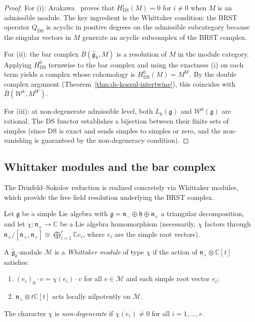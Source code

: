 \begin{proof}
For (i): Arakawa~\cite{Arakawa17} proves that $H^i_{\mathrm{DS}}(M) = 0$
for $i \neq 0$ when $M$ is an admissible module. The key
ingredient is the Whittaker condition: the BRST operator
$Q_{\mathrm{DS}}$ is acyclic in positive degrees on the
admissible subcategory because the singular vectors in
$M$ generate an acyclic subcomplex of the BRST complex.

For (ii): the bar complex $\bar{B}(\widehat{\mathfrak{g}}_k, M)$
is a resolution of $M$ in the module category. Applying
$H^0_{\mathrm{DS}}$ termwise to the bar complex and using the
exactness (i) on each term yields a complex whose cohomology
is $H^0_{\mathrm{DS}}(M) = M^W$. By the double complex
argument (Theorem~\ref{thm:ds-koszul-intertwine}), this
coincides with $\bar{B}(\mathcal{W}^k, M^W)$.

For (iii): at non-degenerate admissible level, both
$L_k(\mathfrak{g})$ and $\mathcal{W}^k(\mathfrak{g})$ are
rational. The DS functor establishes a bijection between
their finite sets of simples (since DS is exact and sends
simples to simples or zero, and the non-vanishing is
guaranteed by the non-degeneracy condition).
\end{proof}

\subsection{Whittaker modules and the bar complex}
\label{sec:whittaker-modules}

The Drinfeld--Sokolov reduction is realized concretely via
Whittaker modules, which provide the free field resolution
underlying the BRST complex.

\begin{definition}
\label{def:whittaker-module}
Let $\mathfrak{g}$ be a simple Lie algebra with
$\mathfrak{g} = \mathfrak{n}_- \oplus \mathfrak{h} \oplus
\mathfrak{n}_+$ a triangular decomposition, and let
$\chi \colon \mathfrak{n}_+ \to \mathbb{C}$ be a Lie algebra
homomorphism (necessarily, $\chi$ factors through
$\mathfrak{n}_+ / [\mathfrak{n}_+, \mathfrak{n}_+] \cong
\bigoplus_{i=1}^r \mathbb{C} e_i$, where $e_i$ are the
simple root vectors).

A $\widehat{\mathfrak{g}}_k$-module $\mathcal{M}$ is a
\emph{Whittaker module} of type $\chi$ if the action of
$\mathfrak{n}_+ \otimes \mathbb{C}[t]$ satisfies:
\begin{enumerate}[label=\textup{(\roman*)}]
\item $(e_i)_0 \cdot v = \chi(e_i) \cdot v$ for all
 $v \in \mathcal{M}$ and each simple root vector $e_i$;
\item $\mathfrak{n}_+ \otimes t\mathbb{C}[t]$ acts locally
 nilpotently on $\mathcal{M}$.
\end{enumerate}
The character $\chi$ is \emph{non-degenerate} if
$\chi(e_i) \neq 0$ for all $i = 1, \ldots, r$.
\end{definition}

